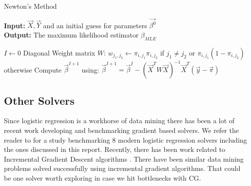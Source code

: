 \documentclass[12pt]{article}
\newcommand{\bS}[1] {\boldsymbol  #1}
\begin{document}
\begin{algorithm}
\caption{Newton's Method}
	\textbf{Input:} $\vec{X},\vec{Y}$ and an initial guess for parameters $\vec{\beta^{0}}$ \\
	\textbf{Output:} The maximum likelihood estimator $\beta_{MLE}$
\begin{algorithmic}               
\State $I \leftarrow 0$
\Repeat 
\State Diagonal Weight matrix $W$: $w_{j_1,j_2} \leftarrow \pi_{i,j_1}\pi_{i,j_2}$ if $j_1 \neq j_2$ or $\pi_{i,j_1}(1-\pi_{i,j_2})$ otherwise
\State Compute $\vec{\beta}^{I+1}$  using:
\State $\vec{\beta}^{I+1} =\vec{\beta}^{I} - (\vec{X}^{T} W \vec{X})^{-1} \vec{X}^{T} (\vec{y} - \vec{\pi}) $
\end{algorithmic}
\label{alg:Newton}
\end{algorithm}

%

\subsection*{Other Solvers}\label{sec:others}
Since logistic regression is a workhorse of data mining there has been a lot of recent work developing and benchmarking gradient based solvers. We refer the reader to \cite{Minka2003} for a study benchmarking 8 modern logistic regression solvers including the ones discussed in this report. Recently, there has been work related to Incremental Gradient Descent algorithms \cite{Bertsekas2010}. There have been similar data mining problems solved successfully using incremental gradient algorithms. That could be one solver worth exploring in case we hit bottlenecks with CG.
\end{document}
